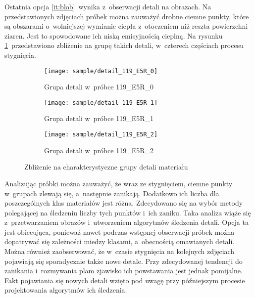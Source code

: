 Ostatnia opcja \ref{it:blob}~wynika z~obserwacji detali na obrazach.
Na przedstawionych zdjęciach próbek można zauważyć drobne ciemne punkty, które
są obszarami o~wolniejszej wymianie ciepła z~otoczeniem niż reszta powierzchni
ziaren.
Jest to spowodowane ich niską emisyjnością cieplną.
Na rysunku \ref{fig:blob_detail}~przedstawiono zbliżenie na grupę takich detali,
w~czterech częściach procesu stygnięcia.
\begin{figure}[h]
    \hspace*{\fill}
    \begin{subfigure}{0.3\textwidth}
        \centering
        \texttt{[image: sample/detail\_119\_E5R\_0]}
        \caption{Grupa detali w~próbce 119\_E5R\_0}
    \end{subfigure}
    \hfill
    \centering
    \begin{subfigure}{0.3\textwidth}
        \centering
        \texttt{[image: sample/detail\_119\_E5R\_1]}
        \caption{Grupa detali w~próbce 119\_E5R\_1}
    \end{subfigure}
    \hfill
    \begin{subfigure}{0.3\textwidth}
        \centering
        \texttt{[image: sample/detail\_119\_E5R\_2]}
        \caption{Grupa detali w~próbce 119\_E5R\_2}
    \end{subfigure}
    \hspace*{\fill}
    \caption{Zbliżenie na charakterystyczne grupy detali materiału}
    \label{fig:blob_detail}
\end{figure}

Analizując próbki można zauważyć, że wraz ze stygnięciem, ciemne punkty
w~grupach zlewają się, a~następnie zanikają.
Dodatkowo ich liczba dla poszczególnych klas materiałów jest różna.
Zdecydowano się na wybór metody polegającej na śledzeniu liczby tych punktów
i~ich zaniku.
Taka analiza wiąże się z~przetwarzaniem obrazów i~utworzeniem algorytmów
śledzenia detali.
Opcja ta jest obiecująca, ponieważ nawet podczas wstępnej obserwacji próbek
można dopatrywać się zależności miedzy klasami, a~obecnością omawianych detali.
Można również zaobserwować, że w~czasie stygnięcia na kolejnych zdjęciach
pojawiają się sporadycznie także nowe detale.
Przy zdecydowanej tendencji do zanikania i~rozmywania plam zjawisko ich
powstawania jest jednak pomijalne.
Fakt pojawiania się nowych detali wzięto pod uwagę przy późniejszym procesie
projektowania algorytmów ich śledzenia.


